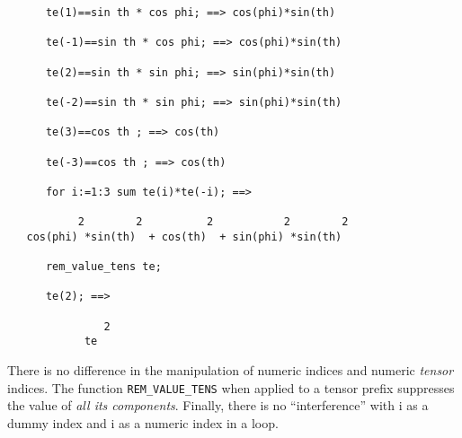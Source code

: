\begin{verbatim}
      te(1)==sin th * cos phi; ==> cos(phi)*sin(th)

      te(-1)==sin th * cos phi; ==> cos(phi)*sin(th)

      te(2)==sin th * sin phi; ==> sin(phi)*sin(th)

      te(-2)==sin th * sin phi; ==> sin(phi)*sin(th)

      te(3)==cos th ; ==> cos(th)

      te(-3)==cos th ; ==> cos(th)

      for i:=1:3 sum te(i)*te(-i); ==>

           2        2          2           2        2
   cos(phi) *sin(th)  + cos(th)  + sin(phi) *sin(th)

      rem_value_tens te; 

      te(2); ==> 

               2
            te 
\end{verbatim}
There is no difference in the manipulation of numeric indices and numeric 
\emph{tensor} indices. The function \texttt{REM\_VALUE\_TENS}
when applied to a tensor prefix suppresses the value of 
\emph{all its components}. Finally, there is no ``interference'' with 
i as a dummy index and i as a numeric index in a loop.       

